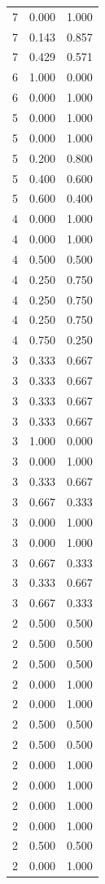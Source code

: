 \begin{tabular}{rrr}
7 & 0.000 & 1.000 \\
7 & 0.143 & 0.857 \\
7 & 0.429 & 0.571 \\
6 & 1.000 & 0.000 \\
6 & 0.000 & 1.000 \\
5 & 0.000 & 1.000 \\
5 & 0.000 & 1.000 \\
5 & 0.200 & 0.800 \\
5 & 0.400 & 0.600 \\
5 & 0.600 & 0.400 \\
4 & 0.000 & 1.000 \\
4 & 0.000 & 1.000 \\
4 & 0.500 & 0.500 \\
4 & 0.250 & 0.750 \\
4 & 0.250 & 0.750 \\
4 & 0.250 & 0.750 \\
4 & 0.750 & 0.250 \\
3 & 0.333 & 0.667 \\
3 & 0.333 & 0.667 \\
3 & 0.333 & 0.667 \\
3 & 0.333 & 0.667 \\
3 & 1.000 & 0.000 \\
3 & 0.000 & 1.000 \\
3 & 0.333 & 0.667 \\
3 & 0.667 & 0.333 \\
3 & 0.000 & 1.000 \\
3 & 0.000 & 1.000 \\
3 & 0.667 & 0.333 \\
3 & 0.333 & 0.667 \\
3 & 0.667 & 0.333 \\
2 & 0.500 & 0.500 \\
2 & 0.500 & 0.500 \\
2 & 0.500 & 0.500 \\
2 & 0.000 & 1.000 \\
2 & 0.000 & 1.000 \\
2 & 0.500 & 0.500 \\
2 & 0.500 & 0.500 \\
2 & 0.000 & 1.000 \\
2 & 0.000 & 1.000 \\
2 & 0.000 & 1.000 \\
2 & 0.000 & 1.000 \\
2 & 0.500 & 0.500 \\
2 & 0.000 & 1.000 \\

\end{tabular}

